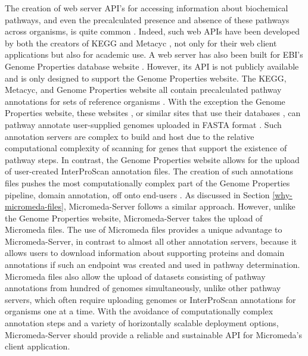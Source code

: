 The creation of web server API's for accessing information about biochemical pathways, and even the precalculated presence and absence of these pathways across organisms, is quite common \cite{wu2006kobas,moriya2010pathpred,pireddu2006path,vallenet2009microscope,aziz2008rast,takami2016automated,moriya2007kaas,chou2009fmm}. Indeed, such web APIs have been developed by both the creators of KEGG \cite{kawashima2003kegg} and Metacyc \cite{karp2013data}, not only for their web client applications but also for academic use. A web server has also been built for EBI's Genome Properties database website \cite{richardson2018genome}. However, its API is not publicly available and is only designed to support the Genome Properties website. The KEGG, Metacyc, and Genome Properties website all contain precalculated pathway annotations for sets of reference organisms \cite{kanehisa2000kegg,karp2002metacyc,karp2013data}. With the exception the Genome Properties website, these websites \cite{kanehisa2016blastkoala}, or similar sites that use their databases \cite{chou2009fmm,moriya2007kaas,takami2016automated}, can pathway annotate user-supplied genomes uploaded in FASTA format \cite{pearson19905}. Such annotation servers are complex to build and host due to the relative computational complexity of scanning for genes that support the existence of pathway steps. In contrast, the Genome Properties website allows for the upload of user-created InterProScan annotation files. The creation of such annotations files pushes the most computationally complex part of the Genome Properties pipeline, domain annotation, off onto end-users \cite{richardson2018genome}. As discussed in Section \ref{why-micromeda-files}, Micromeda-Server follows a similar approach. However, unlike the Genome Properties website, Micromeda-Server takes the upload of Micromeda files. The use of Micromeda files provides a unique advantage to Micromeda-Server, in contrast to almost all other annotation servers, because it allows users to download information about supporting proteins and domain annotations if such an endpoint was created and used in pathway determination. Micromeda files also allow the upload of datasets consisting of pathway annotations from hundred of genomes simultaneously, unlike other pathway servers, which often require uploading genomes or InterProScan annotations for organisms one at a time. With the avoidance of computationally complex annotation steps and a variety of horizontally scalable deployment options, Micromeda-Server should provide a reliable and sustainable API for Micromeda's client application.
